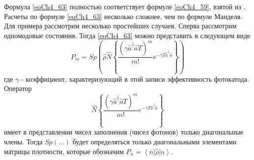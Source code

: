 Формула \eqref{eqCh4_63} полностью соответствует формуле
\eqref{eqCh4_59}, взятой из \cite{bLoudon1976}. Расчеты по
формуле \eqref{eqCh4_63} несколько 
сложнее, чем по формуле Манделя. Для примера рассмотрим несколько
простейших случаев. Сперва рассмотрим одномодовые состояния. Тогда
\eqref{eqCh4_63} можно представить в следующем виде 
\[
P_m = Sp\left(
\hat{\rho}
\hat{N}
\left\{
\frac{\left(\gamma \overline{\hat{a}^{\dag} \hat{a}} T\right)^m}{m!}
e^{- \gamma T \overline{\hat{a}^{\dag} \hat{a}}}
\right\}
\right)
\]
где $\gamma$ - коэффициент, характеризующий в этой записи
эффективность фотокатода. Оператор 
\[
\hat{N}
\left\{
\frac{\left(\gamma \overline{\hat{a}^{\dag} \hat{a}} T\right)^m}{m!}
e^{- \gamma T \overline{\hat{a}^{\dag} \hat{a}}}
\right\}
\]
имеет в представлении чисел заполнения (чисел фотонов) только
диагональные члены. Тогда $Sp\left(\dots\right)$ будет определяться
только диагональными элементами матрицы плотности, 
которые обозначим $P_n = \left<n\right|\hat{\rho}\left|n\right>$.

